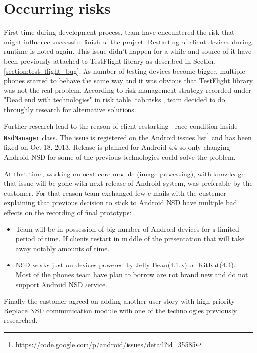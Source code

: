 \section{Occurring risks}
\label{sec:sprint5_occuring_risks}
First time during development process, team have encountered the risk that might influence successful finish of the project. 
Restarting of client devices during runtime is noted again. This issue didn't happen for a while and source of it have been previously attached to TestFlight library as described in Section \ref{section:test_flight_bug}. As number of testing devices become bigger, multiple phones started to behave the same way and it was obvious that TestFlight library was not the real problem. According to risk management strategy recorded under "Dead end with technologies" in risk table \ref{tab:risks}, team decided to do throughly research for alternative solutions. 

Further research lead to the reason of client restarting - race condition inside \texttt{NsdManager} class. The issue is registered on the Android issues list\footnote{\url{https://code.google.com/p/android/issues/detail?id=35585}} and has been fixed on Oct 18. 2013. Release is planned for Android 4.4 so only changing Android NSD for some of the previous technologies could solve the problem. 

At that time, working on next core module (image processing), with knowledge that issue will be gone with next release of Android system, was preferable by the customer. For that reason team exchanged few e-mails with the customer explaining that previous decision to stick to Android NSD have multiple bad effects on the recording of final prototype:
\begin{itemize}
\item Team will be in possession of big number of Android devices for a limited period of time. If clients restart in middle of the presentation that will take away notably amounts of time.

\item NSD works just on devices powered by Jelly Bean(4.1.x) or KitKat(4.4). Most of the phones team have plan to borrow are not brand new and do not support Android NSD service.
\end{itemize}

Finally the customer agreed on adding another user story with high priority - Replace NSD communication module with one of the technologies previously researched.

